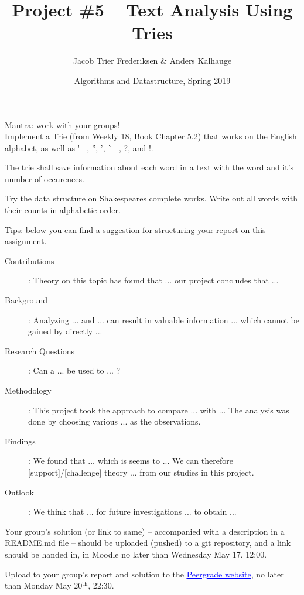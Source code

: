 \documentclass[12pt,a4paper,final]{article}
\title{Project \#5 -- Text Analysis Using Tries}
\author{Jacob Trier Frederiksen \& Anders Kalhauge}
\date{Algorithms and Datastructure, Spring 2019}
\begin{document}
\maketitle

Mantra: work with your groups! \\

Implement a Trie (from Weekly 18, Book Chapter 5.2) that works on the English alphabet, as well as \' ~, '', ', \` ~, ?, and !.

The trie shall save information about each word in a text with the word and it's
number of occurences.

Try the data structure on Shakespeares complete works.
Write out all words with their counts in alphabetic order.

Tips: below you can find a suggestion for structuring your report on this assignment.

\begin{description}
   \item[Contributions]: Theory on this topic has found that ... our project concludes that ... 
   \item[Background]: Analyzing ...  and ...  can result in valuable information ... which cannot be gained by directly ... 
   \item[Research Questions]: Can a ... be used to ... ? 
   \item[Methodology]: This project took the approach to compare ... with ... The analysis was done by choosing various ... as the observations. 
   \item[Findings]: We found that ... which is seems to ... We can therefore [support]/[challenge] theory ... from our studies in this project.
   \item[Outlook]: We think that ... for future investigations ... to obtain ... 
\end{description}

Your group's solution (or link to same) -- accompanied with a description in a README.md file -- should
be uploaded (pushed) to a git repository, and a link should be handed in, in Moodle
no later than Wednesday May 17. 12:00.

Upload to your group's report and solution to the \href{https://www.peergrade.io}{\textcolor{blue}{\underline{Peergrade website}}}, no later than Monday May 20$^\textrm{th}$, 22:30. 
\end{document}
